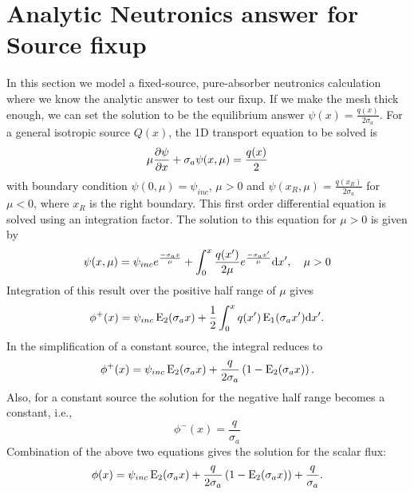 \section{Analytic Neutronics answer for Source fixup}

In this section we model a fixed-source, pure-absorber neutronics calculation where we know the
analytic answer to test our fixup.  If we make the mesh thick enough, we can set the
solution to be the equilibrium answer $\psi(x) = \frac{q(x)}{2\sigma_a}$. For a general
isotropic source $Q(x)$, the 1D transport equation to be solved is
\begin{equation}
    \mu \frac{\partial \psi}{\partial x} + \sigma_a \psi(x,\mu) = \frac{q(x)}{2}
\end{equation}
with boundary condition $\psi(0,\mu)=\psi_{inc}$, $\mu>0$ and
$\psi(x_R,\mu)=\frac{q(x_R)}{2\sigma_a}$ for
$\mu<0$, where $x_R$ is the right boundary.  
This first order differential equation is solved using an integration factor.
The solution to this equation for $\mu>0$ is given by
\begin{equation}
    \psi(x,\mu) = \psi_{inc}e^{\frac{-\sigma_a x}{\mu}} + \int_0^x \frac{q(x')}{2\mu}
    e^{\frac{-\sigma_a x'}{\mu}} \mathrm{d} x',\quad \mu>0
\end{equation}
Integration of this result over the positive half range of $\mu$ gives
\begin{equation}
    \phi^+(x) = \psi_{inc}\operatorname{E}_{2}(\sigma_a x) + \frac{1}{2}\int_0^x q(x')\operatorname{E}_{1}(\sigma_a x')
    \mathrm{d} x'.
\end{equation}
In the simplification of a constant source, the integral reduces to
\begin{equation}
    \phi^+(x) = \psi_{inc}\operatorname{E}_{2}(\sigma_a x) + \frac{q}{2\sigma_a} \left(1 -
    \operatorname{E}_{2}(\sigma_ax)\right).
\end{equation}
Also, for a constant source the solution for the negative half range becomes a constant, i.e.,
\begin{equation}
    \phi^{-}(x) = \frac{q}{\sigma_a}
\end{equation}
Combination of the above two equations gives the solution for the scalar flux:
\begin{equation}
    \phi(x) = \psi_{inc}\operatorname{E}_{2}(\sigma_a x) + \frac{q}{2\sigma_a} \left(1 -
    \operatorname{E}_{2}(\sigma_ax)\right) + \frac{q}{\sigma_a}.
\end{equation}

